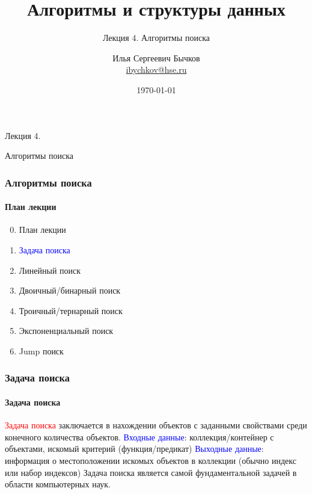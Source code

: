 \documentclass[aspectratio=169]{beamer}
\title[Title]{Алгоритмы и структуры данных}
\subtitle{Лекция 4. Алгоритмы поиска}
\author[Author's name]{Илья Сергеевич Бычков\\ \smallskip \scriptsize \url{ibychkov@hse.ru}}
\institute{НИУ ВШЭ - Нижний Новгород}
\date{\today}
\begin{document}
\frame[plain]{\titlepage}

\begin{frame}[c]

\begin{center}
\Huge Лекция 4.

\Huge Алгоритмы поиска
\end{center}

\end{frame}

\begin{frame}
\frametitle{Алгоритмы поиска}
\framesubtitle{План лекции}

\begin{enumerate}
  \setcounter{enumi}{-1}
  \item{План лекции}
  \item{\textcolor{blue}{Задача поиска}}
  \item{Линейный поиск}
  \item{Двоичный/бинарный поиск}
  \item{Троичный/тернарный поиск}
  \item{Экспоненциальный поиск}
  \item{Jump поиск}
\end{enumerate}
\end{frame}



\begin{frame}
\frametitle{Задача поиска}
\framesubtitle{Задача поиска}
\justifying
\textcolor{red}{Задача поиска} заключается в нахождении объектов с заданными свойствами среди конечного количества объектов.
\newline\newline
\textcolor{blue}{Входные данные}: коллекция/контейнер с объектами, искомый критерий \newline (функция/предикат)\newline\newline
\textcolor{blue}{Выходные данные}: информация о местоположении искомых объектов в коллекции (обычно индекс или набор индексов)\newline\newline
Задача поиска является самой фундаментальной задачей в области компьютерных наук.
\end{frame}
\end{document}
